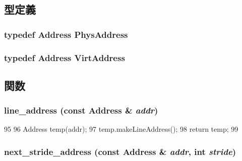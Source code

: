 \subsection{型定義}
\hypertarget{Address_8hh_a1572cc21e068a948c429d76aff2cb368}{
\subsubsection[{PhysAddress}]{\setlength{\rightskip}{0pt plus 5cm}typedef {\bf Address} {\bf PhysAddress}}}
\label{Address_8hh_a1572cc21e068a948c429d76aff2cb368}
\hypertarget{Address_8hh_abb5304a7395a6cbcf21dd679354a6593}{
\subsubsection[{VirtAddress}]{\setlength{\rightskip}{0pt plus 5cm}typedef {\bf Address} {\bf VirtAddress}}}
\label{Address_8hh_abb5304a7395a6cbcf21dd679354a6593}


\subsection{関数}
\hypertarget{Address_8hh_abe46a2cc64664e1a3a02d0a501e4f21d}{
\subsubsection[{line\_\-address}]{ line\_\-address (const {\bf Address} \& {\em addr})}}
\label{Address_8hh_abe46a2cc64664e1a3a02d0a501e4f21d}



\begin{DoxyCode}
95 {
96     Address temp(addr);
97     temp.makeLineAddress();
98     return temp;
99 }
\end{DoxyCode}
\hypertarget{Address_8hh_a4e1398eb42e200863179d5ae0c90a715}{
\subsubsection[{next\_\-stride\_\-address}]{ next\_\-stride\_\-address (const {\bf Address} \& {\em addr}, \/  int {\em stride})}}
\label{Address_8hh_a4e1398eb42e200863179d5ae0c90a715}



